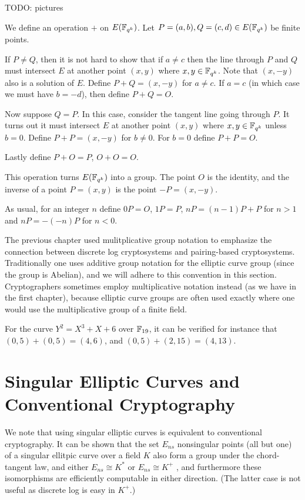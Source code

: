 TODO: pictures

We define an operation $+$ on $E(\mathbb{F}_{q^k})$.
Let $P = (a,b), Q = (c,d) \in E(\mathbb{F}_{q^k})$ be finite points.

If $P \ne Q$, then it is not hard to show that if $a \ne c$
then the line through $P$ and $Q$ must intersect $E$ at another point
$(x,y)$ where $x, y\in \mathbb{F}_{q^k}$. Note that $(x,-y)$ also is a solution of $E$.
Define $P + Q = (x, -y)$ for $a \ne c$.
If $a = c$ (in which case we must have $b = -d$),
then define $P + Q = O$.

Now suppose $Q = P$. In this case, consider the tangent line going through
$P$. It turns out it must intersect $E$ at another point $(x,y)$ where
$x,y\in\mathbb{F}_{q^k}$ unless $b = 0$. Define $P + P = (x, -y)$ for $b \ne 0$.
For $b = 0$ define $P + P = O$.

Lastly define $P + O = P$, $O + O = O$.

This operation turns $E(\mathbb{F}_{q^k})$ into a group.
The point $O$ is the identity, and the inverse
of a point $P = (x,y)$ is the point $-P = (x,-y)$.

As usual, for an integer $n$ define $0 P = O$, $1 P = P$,
$n P = (n-1)P + P$ for $n > 1$ and $n P = -(-n)P$ for $n < 0$.

The previous chapter used mulitplicative group notation to emphasize
the connection
between discrete log cryptosystems and pairing-based cryptosystems.
Traditionally one uses additive group notation for the elliptic curve group
(since the group is Abelian), and we will adhere to this convention in this
section.
Cryptographers sometimes employ multiplicative notation instead (as we have
in the first chapter),
because elliptic curve groups are often used exactly where one would use
the multiplicative group of a finite field.

For the curve $Y^2 = X^3 + X + 6$ over $\mathbb{F}_{19}$,
it can be verified for instance that
$(0, 5) + (0, 5) = (4, 6)$,
and $(0, 5) + (2, 15) = (4, 13)$.

\section {Singular Elliptic Curves and Conventional Cryptography}

We note that using singular elliptic curves
is equivalent to conventional cryptography.
It can be shown that the set $E_{ns}$ nonsingular points (all but
one) of a singular ellitpic curve over a field $K$
also form a group under the chord-tangent law,
and either $E_{ns} \cong K^*$ or $E_{ns} \cong K^+$ \cite{prop2.5silverman},
and furthermore these isomorphisms are efficiently computable in either
direction.
(The latter case is not useful as discrete log is easy in $K^+$.)

